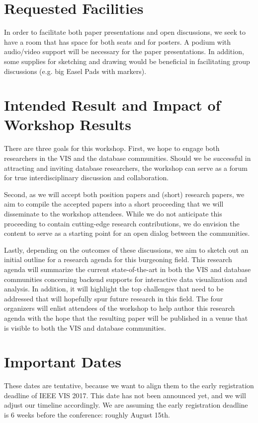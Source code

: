 \documentclass[journal]{vgtc}                %
\begin{document}
\section{Requested Facilities}

In order to facilitate both paper presentations and open discussions, we seek to have a room that has space for both seats and for posters.
A podium with audio/video support will be necessary for the paper presentations.
In addition, some supplies for sketching and drawing would be beneficial in facilitating group discussions (e.g. big Easel Pads with markers).

\section{Intended Result and Impact of Workshop Results}

There are three goals for this workshop. 
First, we hope to engage both researchers in the VIS and the database communities.
Should we be successful in attracting and inviting database researchers, the workshop can serve as a forum for true interdisciplinary discussion and collaboration.

Second, as we will accept both position papers and (short) research papers, we aim to compile the accepted papers into a short proceeding that we will disseminate to the workshop attendees. 
While we do not anticipate this proceeding to contain cutting-edge research contributions, we do envision the content to serve as a starting point for an open dialog between the communities.

Lastly, depending on the outcomes of these discussions, we aim to sketch out an initial outline for a research agenda for this burgeoning field.
This research agenda will summarize the current state-of-the-art in both the VIS and database communities concerning backend supports for interactive data visualization and analysis.
In addition, it will highlight the top challenges that need to be addressed that will hopefully spur future research in this field.
The four organizers will enlist attendees of the workshop to help author this research agenda with the hope that the resulting paper will be published in a venue that is visible to both the VIS and database communities.

\section{Important Dates}

These dates are tentative, because we want to align them to the early
registration deadline of IEEE VIS 2017. This date has not been
announced yet, and we will adjust our timeline accordingly. We are
assuming the early registration deadline is 6 weeks before the
conference: roughly August 15th.
\end{document}
